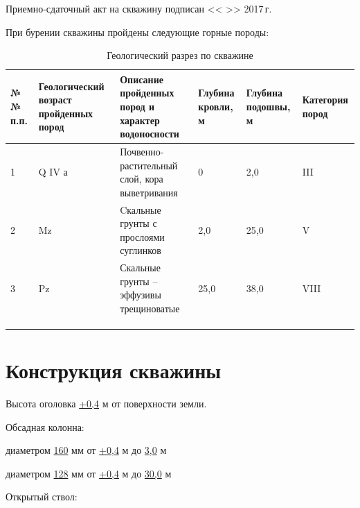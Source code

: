 \documentclass[a4paper,12pt]{article} %
\newcommand{\txtYear}{2017}						%
\newcommand{\txtOgolovok}{+0,4}					%
\newcommand{\txtCondDiam}{160}					%
\newcommand{\txtCondBtm}{3,0}					%
\newcommand{\txtTubeDiam}{128}					%
\newcommand{\txtTubeBtm}{30,0}					%
\newcommand{\txtGeological}{
	1 & Q IV а & Почвенно-растительный слой, кора выветривания & 0    & 2,0  & III \\  \hline
	2 & Mz     & Cкальные грунты с прослоями суглинков         & 2,0  & 25,0 & V   \\  \hline
	3 & Pz     & Скальные грунты – эффузивы трещиноватые       & 25,0 & 38,0 & VIII \\ \hline
	&  &  &  &  &  \\ 	\hline 
	&  &  &  &  &  \\ 	\hline 
	&  &  &  &  &  \\ 	\hline 
}
\begin{document}
	\bigskip
	
	Приемно-сдаточный акт на скважину подписан << \underline{\hspace{0.7cm}} >> \underline{\hspace{3cm}} \txtYear \,г.	
	
	\pagebreak
	
	При бурении скважины пройдены следующие горные породы:

	\begin{table}[!h]\footnotesize
	\centering
	\caption{Геологический разрез по скважине}
	\begin{tabular}{|p{0.7cm}|p{2cm}|p{7cm}|p{1.5cm}|p{1.5cm}|p{1cm}|}
		\hline 
		№№ п.п. & Геологи\-ческий возраст пройденных пород & Описание пройденных пород и характер водоносности & Глубина кровли, м & Глубина подошвы, м & Катего\-рия пород \\ 
		\hline 
	\txtGeological
	\end{tabular} 
	\end{table}

	\section*{Конструкция скважины}

	Высота оголовка	\underline{\txtOgolovok} м	от поверхности земли. 
	
	\bigskip

	Обсадная колонна:

	диаметром \underline{\txtCondDiam} мм от \underline{\txtOgolovok} м до \underline{\txtCondBtm}  м  		
	
	диаметром \underline{\txtTubeDiam} мм от \underline{\txtOgolovok} м до \underline{\txtTubeBtm} м
	
	\bigskip

	Открытый ствол:
\end{document}
